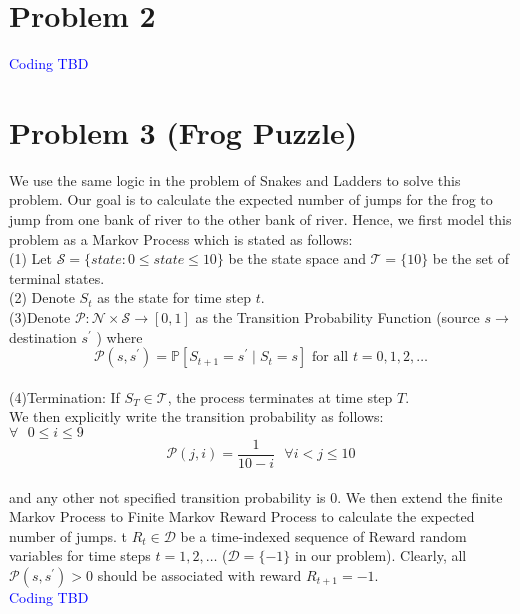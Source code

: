 \documentclass{article}
\begin{document}
\section*{Problem 2}
\textcolor{blue}{Coding TBD}

\section*{Problem 3 (Frog Puzzle)}
We use the same logic in the problem of Snakes and Ladders to solve this problem. Our goal is to calculate the expected number of jumps for the frog to jump from one bank of river to the other bank of river. Hence, we first model this problem as a Markov Process which is stated as follows:\\
\hspace*{1em}(1) Let $\mathcal{S}=\{state: 0\leq state \leq 10 \}$ be the state space and $\mathcal{T}=\{10\}$ be the set of terminal states.\\
\hspace*{1em}(2) Denote $S_{t}$ as the state for time step $t$.\\
\hspace*{1em}(3)Denote $\mathcal{P}: \mathcal{N} \times \mathcal{S} \rightarrow[0,1]$ as the Transition Probability Function (source $s \rightarrow$ destination $s^{\prime}$ ) where
$$
\mathcal{P}\left(s, s^{\prime}\right)=\mathbb{P}\left[S_{t+1}=s^{\prime} \mid S_{t}=s\right] \text { for all } t=0,1,2, \ldots
$$\\
\hspace*{1em}(4)Termination: If $S_{T} \in \mathcal{T}$, the process terminates at time step $T$.\\
We then explicitly write the transition probability as follows:\\
\hspace*{1em}$\forall \text{ } 0\leq i\leq 9 $\\

$$
\mathcal{P}\left(j, i\right) = \frac{1}{10-i}\text{ } \forall i<j \leq 10
$$\\
and any other not specified transition probability is 0.
We then extend the finite Markov Process to Finite Markov Reward Process to calculate the expected number of jumps.
t $R_{t}\in \mathcal{D}$ be a time-indexed sequence of Reward random variables for time steps $t=1,2, \ldots$ ($\mathcal{D}=\{-1\}$ in our problem). Clearly, all $\mathcal{P}\left(s, s^{\prime}\right)> 0$ should be associated with reward $R_{t+1}= -1$.\\
\textcolor{blue}{Coding TBD}
\end{document}
